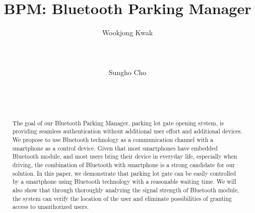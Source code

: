 \documentclass{sig-alternate-ipsn13}
\begin{document}
\title{BPM: Bluetooth Parking Manager}


\author{
\alignauthor
Wookjong Kwak\\
       \\
       \\
       \\
\alignauthor
Sungho Cho\\
       \\
       \\
       \\
}

\maketitle
\begin{abstract}

The goal of our Bluetooth Parking Manager, parking lot gate opening system, is providing seamless authentication without additional user effort and additional devices. We propose to use Bluetooth technology as a communication channel with a smartphone as a control device. Given that most smartphones have embedded Bluetooth module, and most users bring their device in everyday life, especially when driving, the combination of Bluetooth with smartphone is a strong candidate for our solution. In this paper, we demonstrate that parking lot gate can be easily controlled by a smartphone using Bluetooth technology with a reasonable waiting time. We will also show that through thoroughly analyzing the signal strength of Bluetooth module, the system can verify the location of the user and eliminate possibilities of granting access to unauthorized users.

\end{abstract}









%

%
%


\end{document}
